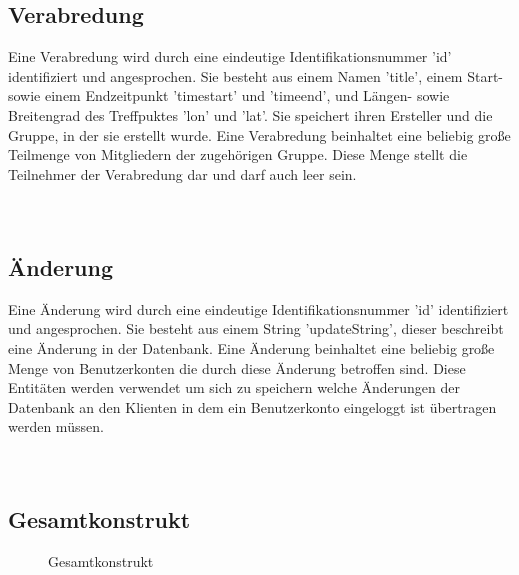 \documentclass[parskip=full,11pt]{scrartcl}
\begin{document}
\pagebreak


\subsection{Verabredung}
Eine Verabredung wird durch eine eindeutige Identifikationsnummer 'id'
identifiziert und angesprochen. Sie besteht aus einem Namen 'title', einem
Start- sowie einem Endzeitpunkt 'timestart' und 'timeend',
und Längen- sowie Breitengrad des Treffpuktes 'lon' und 'lat'. Sie speichert
ihren Ersteller und die Gruppe, in der sie erstellt wurde.
Eine Verabredung beinhaltet eine beliebig große Teilmenge von Mitgliedern der
zugehörigen Gruppe.
Diese Menge stellt die Teilnehmer der Verabredung dar und darf auch leer sein.
\\
\\
\\

\pagebreak

\subsection{Änderung}
Eine Änderung wird durch eine eindeutige Identifikationsnummer 'id'
identifiziert und angesprochen. Sie besteht aus einem String 'updateString',
dieser beschreibt eine Änderung in der Datenbank.
Eine Änderung beinhaltet eine beliebig große Menge von Benutzerkonten die durch
diese Änderung betroffen sind.
Diese Entitäten werden verwendet um sich zu speichern welche Änderungen der
Datenbank an den Klienten in dem ein Benutzerkonto eingeloggt ist übertragen
werden müssen.
\\
\\
\\

\pagebreak



\subsection{Gesamtkonstrukt}
\begin{figure}[!htb]
    \centering
    \def\svgwidth{540pt}
    \caption{Gesamtkonstrukt}
    \label{fig:erd-complete}
\end{figure}
\end{document}
